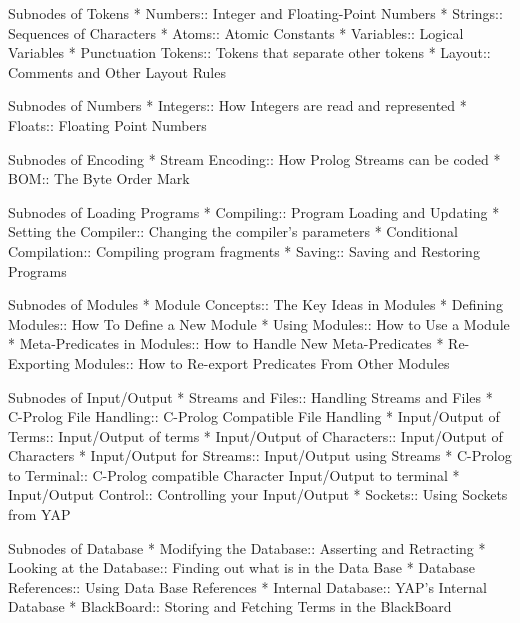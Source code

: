 Subnodes of Tokens
* Numbers:: Integer and Floating-Point Numbers
* Strings:: Sequences of Characters
* Atoms:: Atomic Constants
* Variables:: Logical Variables
* Punctuation Tokens:: Tokens that separate other tokens
* Layout:: Comments and Other Layout Rules

Subnodes of Numbers
* Integers:: How Integers are read and represented
* Floats:: Floating Point Numbers

Subnodes of Encoding
* Stream Encoding:: How Prolog Streams can be coded
* BOM:: The Byte Order Mark

Subnodes of Loading Programs
* Compiling:: Program Loading and Updating
* Setting the Compiler:: Changing the compiler's parameters
* Conditional Compilation:: Compiling program fragments
* Saving:: Saving and Restoring Programs

Subnodes of Modules
* Module Concepts:: The Key Ideas in Modules
* Defining Modules:: How To Define a New Module
* Using Modules:: How to Use a Module
* Meta-Predicates in Modules:: How to Handle New Meta-Predicates
* Re-Exporting Modules:: How to Re-export Predicates From Other Modules

Subnodes of Input/Output
* Streams and Files:: Handling Streams and Files
* C-Prolog File Handling:: C-Prolog Compatible File Handling
* Input/Output of Terms:: Input/Output of terms
* Input/Output of Characters:: Input/Output of Characters
* Input/Output for Streams:: Input/Output using Streams
* C-Prolog to Terminal:: C-Prolog compatible Character Input/Output to terminal
* Input/Output Control:: Controlling your Input/Output
* Sockets:: Using Sockets from YAP

Subnodes of Database
* Modifying the Database:: Asserting and Retracting
* Looking at the Database:: Finding out what is in the Data Base
* Database References:: Using Data Base References
* Internal Database:: YAP's Internal Database
* BlackBoard:: Storing and Fetching Terms in the BlackBoard

